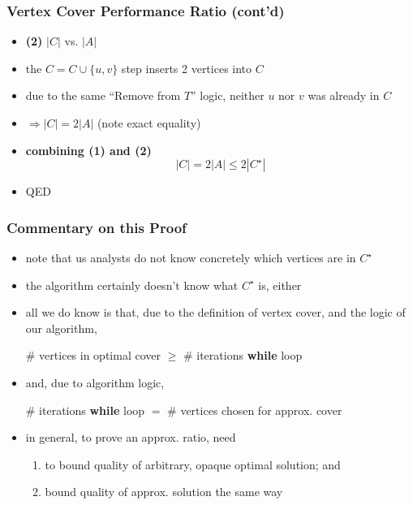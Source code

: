 \documentclass{beamer}
\begin{document}
\begin{frame} \frametitle{Vertex Cover Performance Ratio (cont'd)}
\begin{itemize}
  \item \textbf{(2)} $|C|$ vs. $|A|$
  \item the $C = C \cup \{u, v \}$ step inserts 2 vertices into $C$
  \item  due to the same ``Remove from $T$'' logic, neither $u$ nor $v$ was already
    in $C$
  \item $\Rightarrow |C| = 2|A|$ (note exact equality)
  \item \textbf{combining (1) and (2)}
  \[ |C| = 2|A| \leq 2|C^\star| \]
  \item QED
\end{itemize}
\end{frame}

\begin{frame} \frametitle{Commentary on this Proof}
\begin{itemize}
  \item note that us analysts do not know concretely which vertices are in $C^\star$
  \item the algorithm certainly doesn't know what $C^\star$ is, either
  \item all we do know is that, due to the definition of vertex cover, and
    the logic of our algorithm,
    \begin{center}
      \# vertices in optimal cover $\geq$ \# iterations \textbf{while} loop
    \end{center}
  \item and, due to algorithm logic,
  \begin{center}
      \# iterations \textbf{while} loop $=$ \# vertices chosen for approx. cover
  \end{center}
  \item in general, to prove an approx. ratio, need
  \begin{enumerate}
    \item to bound quality of arbitrary, opaque optimal solution; and
    \item bound quality of approx. solution the same way
  \end{enumerate}
\end{itemize}
\end{frame}
\end{document}

